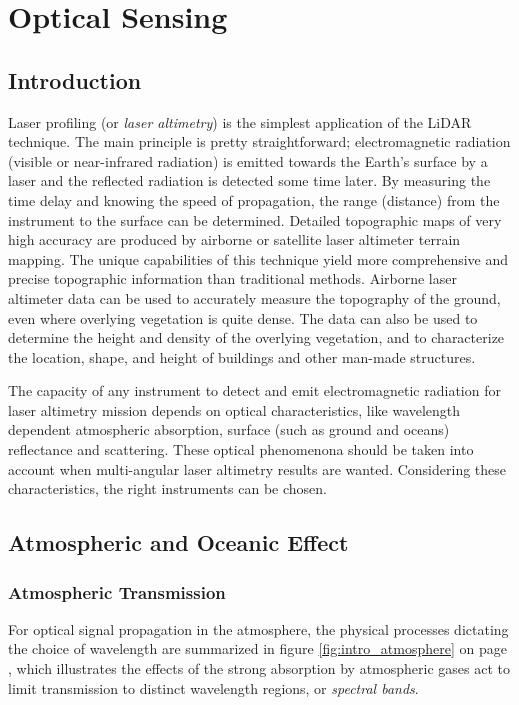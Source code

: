 \clearpage
\section{Optical Sensing}
\label{Optical_emitter_receiver}
\subsection{Introduction}
\label{op_intro}
Laser profiling (or \textit{laser altimetry}) is the simplest application of the \acs{LiDAR} technique. The main principle is pretty straightforward; electromagnetic radiation (visible or near-infrared radiation) is emitted towards the Earth's surface by a \acs{laser} and the reflected radiation is detected some time later. By measuring the time delay and knowing the speed of propagation, the range (distance) from the instrument to the surface can be determined. Detailed topographic maps of very high accuracy are produced by airborne or satellite laser altimeter terrain mapping. The unique capabilities of this technique yield more comprehensive and precise topographic information than traditional methods. Airborne laser altimeter data can be used to accurately measure the topography of the ground, even where overlying vegetation is quite dense. The data can also be used to determine the height and density of the overlying vegetation, and to characterize the location, shape, and height of buildings and other man-made structures.

The capacity of any instrument to detect and emit electromagnetic radiation for \acs{laser} altimetry mission depends on optical characteristics, like wavelength dependent atmospheric absorption, surface (such as ground and oceans) reflectance and scattering. These optical phenomenona should be taken into account when multi-angular \acs{laser} altimetry results are wanted. Considering these characteristics, the right instruments can be chosen.

\subsection{Atmospheric and Oceanic Effect}
\label{introAandO}
\subsubsection{Atmospheric Transmission}
\label{introAtmospheric}
For optical signal propagation in the atmosphere, the physical processes dictating the choice of wavelength are summarized in figure \ref{fig:intro_atmosphere} on page \pageref{fig:intro_atmosphere}, which illustrates the effects of the strong absorption by atmospheric gases act to limit transmission to distinct wavelength regions, or \textit{spectral bands}.

